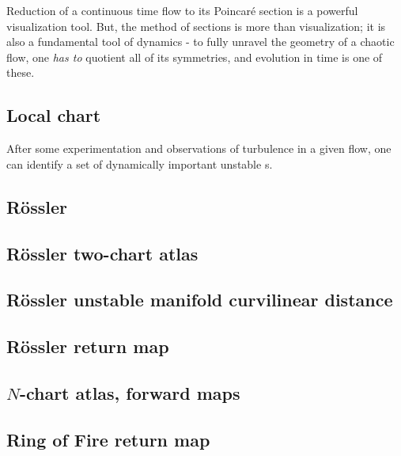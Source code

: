 Reduction of a continuous time flow to its Poincar\'e section is a
powerful visualization tool. But, the method of sections is more than
visualization; it is also a fundamental tool of dynamics - to fully
unravel the geometry of a chaotic flow, one {\em has to} quotient all of
its symmetries, and evolution in time is one of these.

\subsection{Local chart}
After some experimentation and observations of turbulence in a given
flow, one can identify a set of dynamically important unstable
{\recurrStr s}.

\subsection{R\"ossler {\poincBord}}
\subsection{R\"ossler two-chart atlas}
\subsection{R\"ossler unstable manifold curvilinear distance}
\subsection{R\"ossler return map}
\subsection{$N$-chart atlas, forward maps}
\subsection{Ring of Fire return map}
